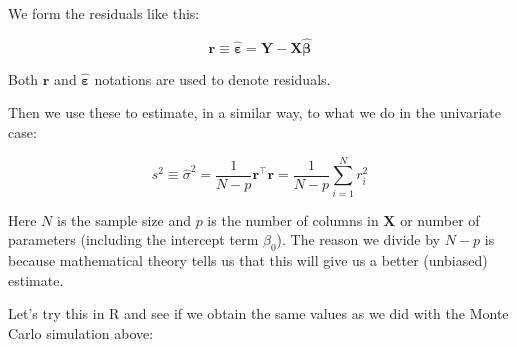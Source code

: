 \documentclass[
  letterpaper,
  DIV=11,
  numbers=noendperiod]{scrartcl}
\newenvironment{Shaded}{\begin{snugshade}}{\end{snugshade}}
\newcommand{\DecValTok}[1]{\textcolor[rgb]{0.68,0.00,0.00}{#1}}
\newcommand{\FunctionTok}[1]{\textcolor[rgb]{0.28,0.35,0.67}{#1}}
\newcommand{\NormalTok}[1]{\textcolor[rgb]{0.00,0.23,0.31}{#1}}
\newcommand{\OtherTok}[1]{\textcolor[rgb]{0.00,0.23,0.31}{#1}}
\newcommand{\SpecialCharTok}[1]{\textcolor[rgb]{0.37,0.37,0.37}{#1}}
\begin{document}
We form the residuals like this:

\[
\mathbf{r}\equiv\boldsymbol{\hat{\varepsilon}} = \mathbf{Y}-\mathbf{X}\boldsymbol{\hat{\beta}}
\]

Both \(\mathbf{r}\) and \(\boldsymbol{\hat{\varepsilon}}\) notations are
used to denote residuals.

Then we use these to estimate, in a similar way, to what we do in the
univariate case:

\[ s^2 \equiv \hat{\sigma}^2 = \frac{1}{N-p}\mathbf{r}^\top\mathbf{r} = \frac{1}{N-p}\sum_{i=1}^N r_i^2\]

Here \(N\) is the sample size and \(p\) is the number of columns in
\(\mathbf{X}\) or number of parameters (including the intercept term
\(\beta_0\)). The reason we divide by \(N-p\) is because mathematical
theory tells us that this will give us a better (unbiased) estimate.

Let's try this in R and see if we obtain the same values as we did with
the Monte Carlo simulation above:

\begin{Shaded}
\end{Shaded}
\end{document}
